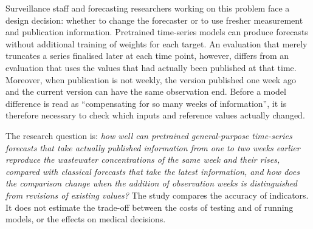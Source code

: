 \documentclass[11pt]{article}
\begin{document}
Surveillance staff and forecasting researchers working on this problem face a design decision: whether to change the forecaster or to use fresher measurement and publication information. Pretrained time-series models can produce forecasts without additional training of weights for each target. An evaluation that merely truncates a series finalised later at each time point, however, differs from an evaluation that uses the values that had actually been published at that time. Moreover, when publication is not weekly, the version published one week ago and the current version can have the same observation end. Before a model difference is read as ``compensating for so many weeks of information'', it is therefore necessary to check which inputs and reference values actually changed.

The research question is: \emph{how well can pretrained general-purpose time-series forecasts that take actually published information from one to two weeks earlier reproduce the wastewater concentrations of the same week and their rises, compared with classical forecasts that take the latest information, and how does the comparison change when the addition of observation weeks is distinguished from revisions of existing values?} The study compares the accuracy of indicators. It does not estimate the trade-off between the costs of testing and of running models, or the effects on medical decisions.
\end{document}
